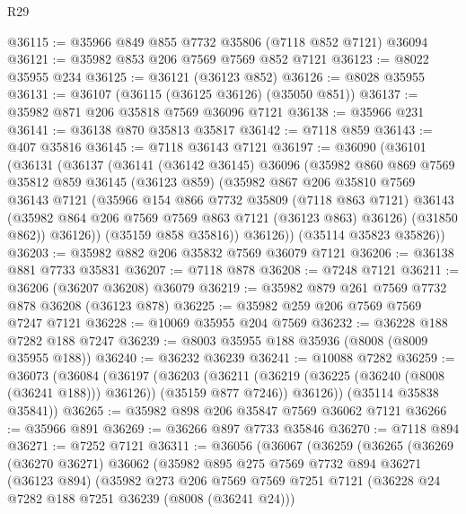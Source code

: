 \begin{lexlean}{R29}
\begin{coremodule}
@36115 := @35966 @849 @855 @7732 @35806 (@7118 @852 @7121) @36094
@36121 := @35982 @853 @206 @7569 @7569 @852 @7121
@36123 := @8022 @35955 @234
@36125 := @36121 (@36123 @852)
@36126 := @8028 @35955
@36131 := @36107 (@36115 (@36125 @36126) (@35050 @851))
@36137 := @35982 @871 @206 @35818 @7569 @36096 @7121
@36138 := @35966 @231
@36141 := @36138 @870 @35813 @35817
@36142 := @7118 @859
@36143 := @407 @35816
@36145 := @7118 @36143 @7121
@36197 := @36090
    (@36101
      (@36131
        (@36137
          (@36141
            (@36142 @36145)
            @36096
            (@35982
              @860
              @869
              @7569
              @35812
              @859
              @36145
              (@36123 @859)
              (@35982
                @867
                @206
                @35810
                @7569
                @36143
                @7121
                (@35966
                  @154
                  @866
                  @7732
                  @35809
                  (@7118 @863 @7121)
                  @36143
                  (@35982 @864 @206 @7569 @7569 @863 @7121 (@36123 @863) @36126)
                  (@31850 @862))
                @36126))
            (@35159 @858 @35816))
          @36126))
      (@35114 @35823 @35826))
@36203 := @35982 @882 @206 @35832 @7569 @36079 @7121
@36206 := @36138 @881 @7733 @35831
@36207 := @7118 @878
@36208 := @7248 @7121
@36211 := @36206 (@36207 @36208) @36079
@36219 := @35982 @879 @261 @7569 @7732 @878 @36208 (@36123 @878)
@36225 := @35982 @259 @206 @7569 @7569 @7247 @7121
@36228 := @10069 @35955 @204 @7569
@36232 := @36228 @188 @7282 @188 @7247
@36239 := @8003 @35955 @188 @35936 (@8008 (@8009 @35955 @188))
@36240 := @36232 @36239
@36241 := @10088 @7282
@36259 := @36073
    (@36084
      (@36197
        (@36203
          (@36211 (@36219 (@36225 (@36240 (@8008 (@36241 @188))) @36126)) (@35159 @877 @7246))
          @36126))
      (@35114 @35838 @35841))
@36265 := @35982 @898 @206 @35847 @7569 @36062 @7121
@36266 := @35966 @891
@36269 := @36266 @897 @7733 @35846
@36270 := @7118 @894
@36271 := @7252 @7121
@36311 := @36056
    (@36067
      (@36259
        (@36265
          (@36269
            (@36270 @36271)
            @36062
            (@35982
              @895
              @275
              @7569
              @7732
              @894
              @36271
              (@36123 @894)
              (@35982
                @273
                @206
                @7569
                @7569
                @7251
                @7121
                (@36228 @24 @7282 @188 @7251 @36239 (@8008 (@36241 @24)))

\end{coremodule}
\end{lexlean}
